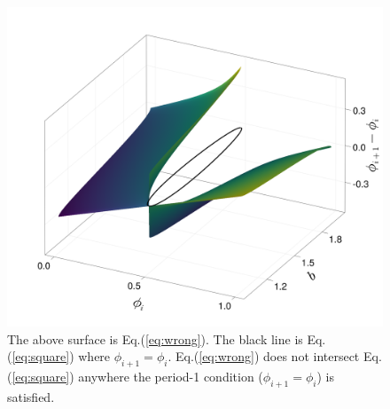 \begin{figure}[H]
    \begin{center}
    \includegraphics[width=.7\textwidth]{figures/eqs18_fig.png}
    \end{center}
    \caption{The above surface is Eq.(\ref{eq:wrong}). The black line is Eq.(\ref{eq:square}) where $\phi_{i+1}=\phi_i$. Eq.(\ref{eq:wrong}) does not intersect Eq.(\ref{eq:square}) anywhere the period-1 condition ($\phi_{i+1}=\phi_i$) is satisfied.}
    \label{instabbound_restric}
\end{figure}

